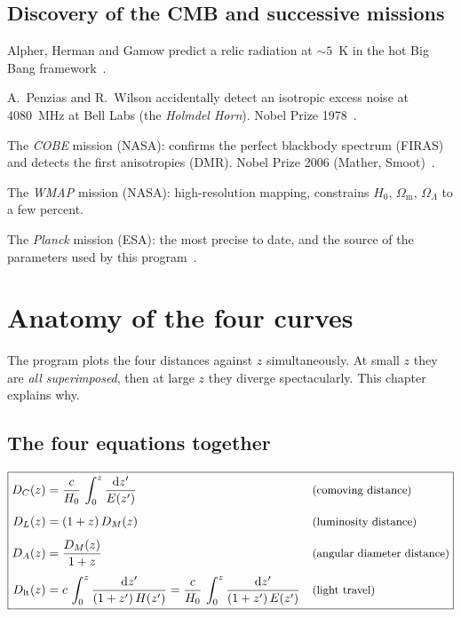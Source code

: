 \documentclass[11pt,a4paper,openany]{report}
\newcommand{\Hzero}{H_{0}}
\newcommand{\Om}{\Omega_{\mathrm{m}}}
\newcommand{\OL}{\Omega_{\Lambda}}
\newcommand{\dif}{\mathrm{d}}
\begin{document}
\section{Discovery of the CMB and successive missions}

\begin{description}[leftmargin=2.2cm]
\item[1948] Alpher, Herman and Gamow predict a relic radiation at $\sim 5$~K in
the hot Big Bang framework~\cite{Alpher1948}.
\item[1965] A.~Penzias and R.~Wilson accidentally detect an isotropic excess
noise at 4080~MHz at Bell Labs (the \emph{Holmdel Horn}). Nobel Prize
1978~\cite{Penzias1965}.
\item[1989-1993] The \emph{COBE} mission (NASA): confirms the perfect blackbody
spectrum (FIRAS) and detects the first anisotropies (DMR). Nobel Prize 2006
(Mather, Smoot)~\cite{Mather1994,Smoot1992}.
\item[2001-2010] The \emph{WMAP} mission (NASA): high-resolution mapping,
constrains $\Hzero$, $\Om$, $\OL$ to a few percent.
\item[2009-2013] The \emph{Planck} mission (ESA): the most precise to date, and
the source of the parameters used by this program~\cite{Planck2018}.
\end{description}

\chapter{Anatomy of the four curves}
\label{chap:curves}

The program plots the four distances against $z$ simultaneously. At small $z$
they are \emph{all superimposed}, then at large $z$ they diverge spectacularly.
This chapter explains why.

\section{The four equations together}

\begin{equation}
\label{eq:all_four}
\boxed{
\begin{aligned}
D_{C}(z)        &= \frac{c}{\Hzero}\,\int_{0}^{z}\frac{\dif z'}{E(z')} &&
\text{\small (comoving distance)} \\[4pt]
D_{L}(z)        &= (1+z)\,D_{M}(z) &&
\text{\small (luminosity distance)} \\[4pt]
D_{A}(z)        &= \frac{D_{M}(z)}{1+z} &&
\text{\small (angular diameter distance)} \\[4pt]
D_{\text{lt}}(z) &= c\,\int_{0}^{z}\frac{\dif z'}{(1+z')\,H(z')}
                  = \frac{c}{\Hzero}\,\int_{0}^{z}\frac{\dif z'}{(1+z')\,E(z')} &&
\text{\small (light travel)}
\end{aligned}
}
\end{equation}
\end{document}
